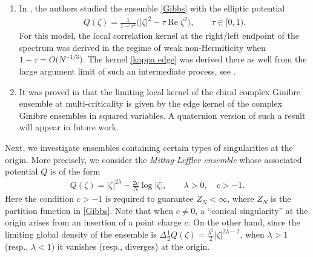 \documentclass[pdftex]{sigma}
\numberwithin{equation}{section}
\newcommand{\re}{\operatorname{Re}}
\newcommand{\1}{\chi}
\begin{document}
\begin{Remark}
\begin{enumerate}
\item[(v)]	In \cite{MR3192169}, the authors studied the ensemble \eqref{Gibbs} with the elliptic potential
		\begin{gather*}
			Q(\zeta)=\tfrac{1}{1-\tau^2} \big( |\zeta|^2-\tau \re \zeta^2 \big), \qquad \tau \in [0,1).
		\end{gather*}
		For this model, the local correlation kernel at the right/left endpoint of the spectrum was derived in the regime of weak non-Hermiticity when $1-\tau=O\big( N^{-1/3}\big)$. The kernel \eqref{kappa edge} was derived there as well from the large argument limit of such an intermediate process, see \cite[equation~(4.28)]{MR3192169}.
		
\item[(vi)] It was proved in \cite{MR4229527} that the limiting local kernel of the chiral complex Ginibre ensemble at multi-criticality is given by the edge kernel of the complex Ginibre ensembles in squared variables. A quaternion version of such a result will appear in future work.
	\end{enumerate}
\end{Remark}

Next, we investigate ensembles containing certain types of singularities at the origin. More precisely, we consider the \textit{Mittag-Leffler ensemble} whose associated potential $Q$ is of the form
\begin{gather} \label{Q ML}
	Q(\zeta)=|\zeta|^{2\lambda}-\frac{2c}{N} \log|\zeta|, \qquad \lambda>0, \quad c>-1.
\end{gather}
Here the condition $c>-1$ is required to guarantee $Z_N < \infty$, where $Z_N$ is the partition function in \eqref{Gibbs}. Note that when $c \not=0$, a ``conical singularity'' at the origin arises from an insertion of a point charge $c$.
On the other hand, since the limiting global density of the ensemble is $\Delta \tfrac12 Q(\zeta)=\tfrac{\lambda^2}2 |\zeta|^{2\lambda-2}$, when $\lambda>1$ (resp., $\lambda<1$) it vanishes (resp., diverges) at the origin.
\end{document}
